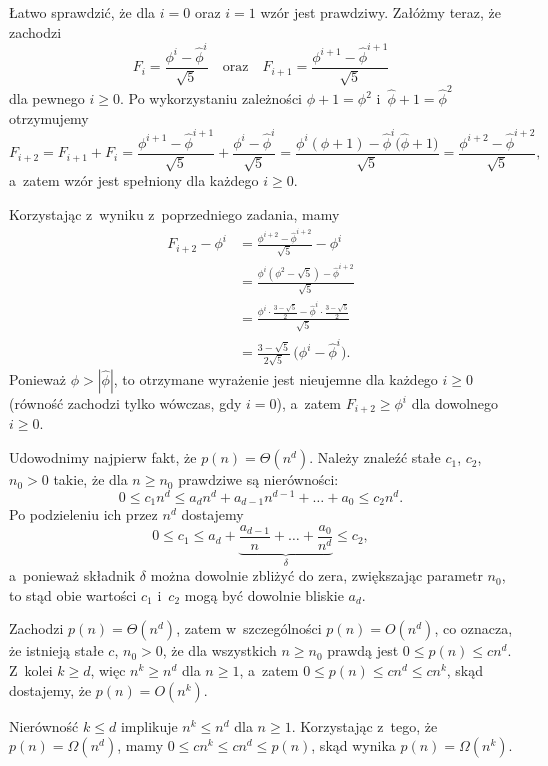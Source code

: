 \exercise %
Łatwo sprawdzić, że dla $i=0$ oraz $i=1$ wzór jest prawdziwy.
Załóżmy teraz, że zachodzi
\[
	F_i = \frac{\phi^i-\widehat\phi^i}{\sqrt{5}} \quad\text{oraz}\quad F_{i+1} = \frac{\phi^{i+1}-\widehat\phi^{i+1}}{\sqrt{5}}
\]
dla pewnego $i\ge0$.
Po wykorzystaniu zależności $\phi+1=\phi^2$ i~$\widehat\phi+1=\widehat\phi^2$ otrzymujemy
\[
	F_{i+2} = F_{i+1}+F_i = \frac{\phi^{i+1}-\widehat\phi^{i+1}}{\sqrt{5}}+\frac{\phi^i-\widehat\phi^i}{\sqrt{5}} = \frac{\phi^i(\phi+1)-\widehat\phi^i\bigl(\widehat\phi+1\bigr)}{\sqrt{5}} = \frac{\phi^{i+2}-\widehat\phi^{i+2}}{\sqrt{5}},
\]
a~zatem wzór jest spełniony dla każdego $i\ge0$.

\exercise %
Korzystając z~wyniku z~poprzedniego zadania, mamy
\begin{align*}
    F_{i+2}-\phi^i &= \frac{\phi^{i+2}-\widehat\phi^{i+2}}{\sqrt{5}}-\phi^i \\[1mm]
	&= \frac{\phi^i(\phi^2-\sqrt{5})-\widehat\phi^{i+2}}{\sqrt{5}} \\[1mm]
	&= \frac{\phi^i\cdot\frac{3-\sqrt{5}}{2}-\widehat\phi^i\cdot\frac{3-\sqrt{5}}{2}}{\sqrt{5}} \\
	&= \frac{3-\sqrt{5}}{2\sqrt{5}}\,\bigl(\phi^i-\widehat\phi^i\bigr).
\end{align*}
Ponieważ $\phi>|\widehat\phi|$, to otrzymane wyrażenie jest nieujemne dla każdego $i\ge0$ (równość zachodzi tylko wówczas, gdy $i=0$), a~zatem $F_{i+2}\ge\phi^i$ dla dowolnego $i\ge0$.

\problems

Udowodnimy najpierw fakt, że $p(n)=\Theta(n^d)$.
Należy znaleźć stałe $c_1$, $c_2$, $n_0>0$ takie, że dla $n\ge n_0$ prawdziwe są nierówności:
\[
	0 \le c_1n^d \le a_dn^d+a_{d-1}n^{d-1}+\dots+a_0 \le c_2n^d.
\]
Po podzieleniu ich przez $n^d$ dostajemy
\[
	0 \le c_1 \le a_d+\underbrace{\frac{a_{d-1}}{n}+\dots+\frac{a_0}{n^d}}_\delta \le c_2,
\]
a~ponieważ składnik $\delta$ można dowolnie zbliżyć do zera, zwiększając parametr $n_0$, to stąd obie wartości $c_1$ i~$c_2$ mogą być dowolnie bliskie $a_d$.

\subproblem %
Zachodzi $p(n)=\Theta(n^d)$, zatem w~szczególności $p(n)=O(n^d)$, co oznacza, że istnieją stałe $c$, $n_0>0$, że dla wszystkich $n\ge n_0$ prawdą jest $0\le p(n)\le cn^d$.
Z~kolei $k\ge d$, więc $n^k\ge n^d$ dla $n\ge1$, a~zatem $0\le p(n)\le cn^d\le cn^k$, skąd dostajemy, że $p(n)=O(n^k)$.

\subproblem %
Nierówność $k\le d$ implikuje $n^k\le n^d$ dla $n\ge1$.
Korzystając z~tego, że $p(n)=\Omega(n^d)$, mamy $0\le cn^k\le cn^d\le p(n)$, skąd wynika $p(n)=\Omega(n^k)$.

